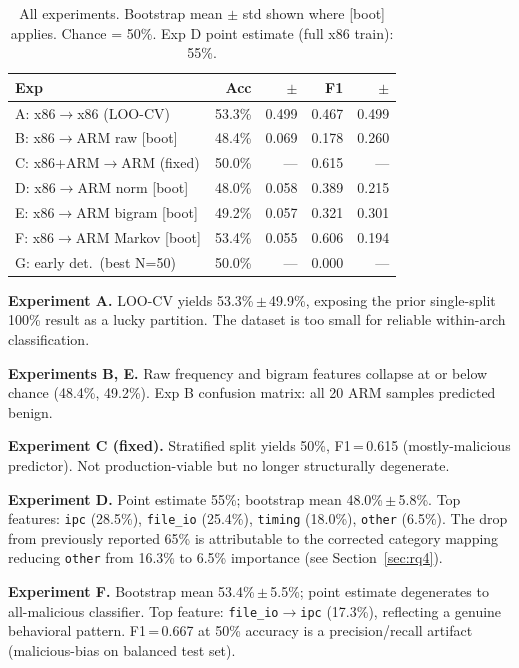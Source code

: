 \documentclass[10pt,twocolumn]{article}
\begin{document}
\begin{table}[h]
\centering
\small
\begin{tabular}{lrrrr}
\toprule
\textbf{Exp} & \textbf{Acc} & \textbf{$\pm$} & \textbf{F1} & \textbf{$\pm$} \\
\midrule
A: x86$\to$x86 (LOO-CV)       & 53.3\% & 0.499 & 0.467 & 0.499 \\
B: x86$\to$ARM raw [boot]      & 48.4\% & 0.069 & 0.178 & 0.260 \\
C: x86+ARM$\to$ARM (fixed)     & 50.0\% & —     & 0.615 & — \\
D: x86$\to$ARM norm [boot]     & 48.0\% & 0.058 & 0.389 & 0.215 \\
E: x86$\to$ARM bigram [boot]   & 49.2\% & 0.057 & 0.321 & 0.301 \\
F: x86$\to$ARM Markov [boot]   & 53.4\% & 0.055 & 0.606 & 0.194 \\
G: early det.\ (best N=50)     & 50.0\% & —     & 0.000 & — \\
\bottomrule
\end{tabular}
\caption{All experiments. Bootstrap mean $\pm$ std shown where [boot] applies.
Chance = 50\%. Exp D point estimate (full x86 train): 55\%.}
\end{table}

\textbf{Experiment A.} LOO-CV yields 53.3\%\,$\pm$\,49.9\%, exposing the prior
single-split 100\% result as a lucky partition. The dataset is too small for
reliable within-arch classification.

\textbf{Experiments B, E.} Raw frequency and bigram features collapse at or
below chance (48.4\%, 49.2\%). Exp B confusion matrix: all 20 ARM samples
predicted benign.

\textbf{Experiment C (fixed).} Stratified split yields 50\%, F1\,=\,0.615
(mostly-malicious predictor). Not production-viable but no longer structurally
degenerate.

\textbf{Experiment D.} Point estimate 55\%; bootstrap mean 48.0\%\,$\pm$\,5.8\%.
Top features: \texttt{ipc} (28.5\%), \texttt{file\_io} (25.4\%),
\texttt{timing} (18.0\%), \texttt{other} (6.5\%). The drop from previously
reported 65\% is attributable to the corrected category mapping reducing
\texttt{other} from 16.3\% to 6.5\% importance (see Section~\ref{sec:rq4}).

\textbf{Experiment F.} Bootstrap mean 53.4\%\,$\pm$\,5.5\%; point estimate
degenerates to all-malicious classifier. Top feature: \texttt{file\_io$\to$ipc}
(17.3\%), reflecting a genuine behavioral pattern. F1\,=\,0.667 at 50\%
accuracy is a precision/recall artifact (malicious-bias on balanced test set).
\end{document}
